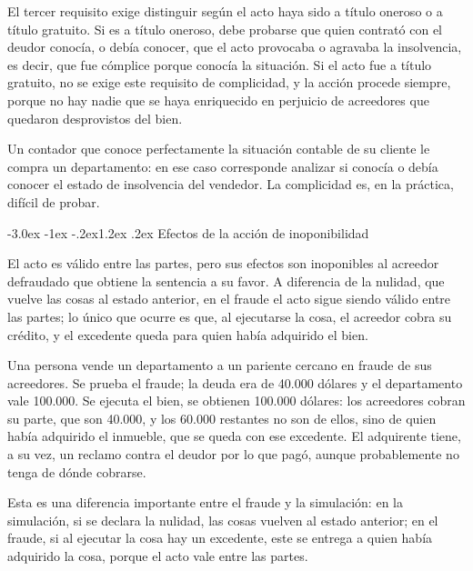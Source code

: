 \documentclass[12pt,oneside]{book}
\makeatletter
\renewcommand\section{\@startsection{section}{1}{\z@}%
  {-3.0ex \@plus -1ex \@minus -.2ex}{1.2ex \@plus .2ex}%
  {\normalfont\large\bfseries\color{acento}}}
\makeatother
\begin{document}
El tercer requisito exige distinguir según el acto haya sido a título oneroso o a título gratuito. Si es a título oneroso, debe probarse que quien contrató con el deudor conocía, o debía conocer, que el acto provocaba o agravaba la insolvencia, es decir, que fue cómplice porque conocía la situación. Si el acto fue a título gratuito, no se exige este requisito de complicidad, y la acción procede siempre, porque no hay nadie que se haya enriquecido en perjuicio de acreedores que quedaron desprovistos del bien.

\begin{ejemplo}
Un contador que conoce perfectamente la situación contable de su cliente le compra un departamento: en ese caso corresponde analizar si conocía o debía conocer el estado de insolvencia del vendedor. La complicidad es, en la práctica, difícil de probar.
\end{ejemplo}

\section{Efectos de la acción de inoponibilidad}

El acto es válido entre las partes, pero sus efectos son inoponibles al acreedor defraudado que obtiene la sentencia a su favor. A diferencia de la nulidad, que vuelve las cosas al estado anterior, en el fraude el acto sigue siendo válido entre las partes; lo único que ocurre es que, al ejecutarse la cosa, el acreedor cobra su crédito, y el excedente queda para quien había adquirido el bien.

\begin{ejemplo}
Una persona vende un departamento a un pariente cercano en fraude de sus acreedores. Se prueba el fraude; la deuda era de 40.000 dólares y el departamento vale 100.000. Se ejecuta el bien, se obtienen 100.000 dólares: los acreedores cobran su parte, que son 40.000, y los 60.000 restantes no son de ellos, sino de quien había adquirido el inmueble, que se queda con ese excedente. El adquirente tiene, a su vez, un reclamo contra el deudor por lo que pagó, aunque probablemente no tenga de dónde cobrarse.

Esta es una diferencia importante entre el fraude y la simulación: en la simulación, si se declara la nulidad, las cosas vuelven al estado anterior; en el fraude, si al ejecutar la cosa hay un excedente, este se entrega a quien había adquirido la cosa, porque el acto vale entre las partes.
\end{ejemplo}
\end{document}
